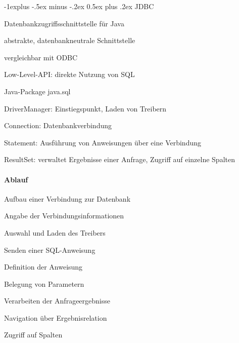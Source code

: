 \documentclass[a4paper]{article}
\makeatletter
\renewcommand{\subsection}{\@startsection{subsection}{2}{0mm}%
                                {-1explus -.5ex minus -.2ex}%
                                {0.5ex plus .2ex}%
                                {\normalfont\normalsize\bfseries}}
\makeatother
\begin{document}
\begin{multicols}{3}
    \subsection{JDBC}
    \begin{itemize*}
        \item Datenbankzugriffsschnittstelle für Java
        \item abstrakte, datenbankneutrale Schnittstelle
        \item vergleichbar mit ODBC
        \item Low-Level-API: direkte Nutzung von SQL
        \item Java-Package java.sql
        \begin{itemize*}
            \item DriverManager: Einstiegspunkt, Laden von Treibern
            \item Connection: Datenbankverbindung
            \item Statement: Ausführung von Anweisungen über eine Verbindung
            \item ResultSet: verwaltet Ergebnisse einer Anfrage, Zugriff auf einzelne Spalten
        \end{itemize*}
    \end{itemize*}



    \paragraph{Ablauf}
    \begin{enumerate*}
        \item Aufbau einer Verbindung zur Datenbank
        \begin{itemize*}
            \item Angabe der Verbindungsinformationen
            \item Auswahl und Laden des Treibers
        \end{itemize*}
        \item Senden einer SQL-Anweisung
        \begin{itemize*}
            \item Definition der Anweisung
            \item Belegung von Parametern
        \end{itemize*}
        \item Verarbeiten der Anfrageergebnisse
        \begin{itemize*}
            \item Navigation über Ergebnisrelation
            \item Zugriff auf Spalten
        \end{itemize*}
    \end{enumerate*}


\end{multicols}
\end{document}
